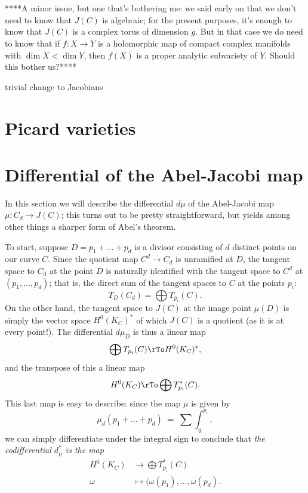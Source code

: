 \

\

****A minor issue, but one that's bothering me: we said early on that we don't need to know that $J(C)$ is algebraic; for the present purposes, it's enough to know that $J(C)$ is a  complex torus of dimension $g$. But in that case we do need to know that if $f : X \to Y$ is a holomorphic map of compact complex manifolds with $\dim X < \dim Y$, then $f(X)$ is a proper analytic subvariety of $Y$. Should this bother us?****

trivial change to Jacobians

\section{Picard varieties}

\section{Differential of the Abel-Jacobi map}

In this section we will describe the differential $d\mu$ of the Abel-Jacobi map $\mu : C_d \to J(C)$; this turns out to be pretty straightforward, but yields among other things a sharper form of Abel's theorem.

To start, suppose $D = p_1 + \dots + p_d$ is a divisor consisting of $d$ distinct points on our curve $C$. Since the quotient map $C^d \to C_d$ is unramified at $D$, the tangent space to $C_d$ at the point $D$ is naturally identified with the tangent space to $C^d$ at $(p_1,\dots,p_d)$; that is, the direct sum of the tangent spaces to $C$ at the points $p_i$:
$$
T_D(C_d) = \bigoplus T_{p_i}(C).
$$
On the other hand, the tangent space to $J(C)$ at the image point $\mu(D)$ is simply the vector space $H^0(K_C)^*$ of which $J(C)$ is a quotient (as it is at every point!). The differential $d\mu_D$ is thus a linear map
$$
\bigoplus T_{p_i}(C) \rTo H^0(K_C)^*,
$$
and the transpose of this a linear map
$$
H^0(K_C) \rTo \bigoplus T^*_{p_i}(C).
$$
This last map is easy to describe: since the map $\mu$ is given by 
$$
\mu_d(p_1 + \dots + p_d) \; = \; \sum \int_q^{p_i},
$$
we can simply differentiate under the integral sign to conclude that \emph{the codifferential $d_\mu^*$ is the map}
\begin{align*}
H^0(K_C) &\to \bigoplus T^*_{p_i}(C) \\
\omega &\mapsto (\omega(p_1), \dots, \omega(p_d).
\end{align*}

